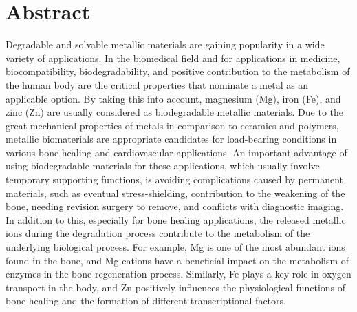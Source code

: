 \chapter{Abstract}                                 \label{ch:abstract}

Degradable and solvable metallic materials are gaining popularity in a wide variety of applications. In the biomedical field and for applications in medicine, biocompatibility, biodegradability, and positive contribution to the metabolism of the human body are the critical properties that nominate a metal as an applicable option. By taking this into account, magnesium (Mg), iron (Fe), and zinc (Zn) are usually considered as biodegradable metallic materials. Due to the great mechanical properties of metals in comparison to ceramics and polymers, metallic biomaterials are appropriate candidates for load-bearing conditions in various bone healing and cardiovascular applications. An important advantage of using biodegradable materials for these applications, which usually involve temporary supporting functions, is avoiding complications caused by permanent materials, such as eventual stress-shielding, contribution to the weakening of the bone, needing revision surgery to remove, and conflicts with diagnostic imaging. In addition to this, especially for bone healing applications, the released metallic ions during the degradation process contribute to the metabolism of the underlying biological process. For example, Mg is one of the most abundant ions found in the bone, and Mg cations have a beneficial impact on the metabolism of enzymes in the bone regeneration process. Similarly, Fe plays a key role in oxygen transport in the body, and Zn positively influences the physiological functions of bone healing and the formation of different transcriptional factors.

